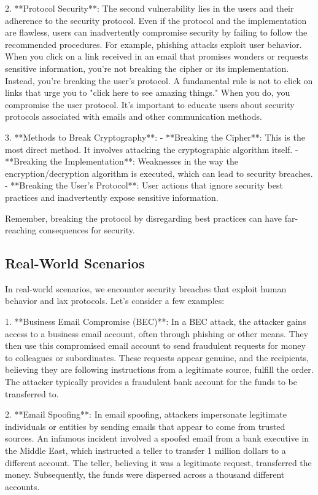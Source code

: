 \documentclass{class}
\begin{document}
2. **Protocol Security**: The second vulnerability lies in the users and their adherence to the security protocol. Even if the protocol and the implementation are flawless, users can inadvertently compromise security by failing to follow the recommended procedures. For example, phishing attacks exploit user behavior. When you click on a link received in an email that promises wonders or requests sensitive information, you're not breaking the cipher or its implementation. Instead, you're breaking the user's protocol. A fundamental rule is not to click on links that urge you to "click here to see amazing things." When you do, you compromise the user protocol. It's important to educate users about security protocols associated with emails and other communication methods.

3. **Methods to Break Cryptography**:
- **Breaking the Cipher**: This is the most direct method. It involves attacking the cryptographic algorithm itself.
- **Breaking the Implementation**: Weaknesses in the way the encryption/decryption algorithm is executed, which can lead to security breaches.
- **Breaking the User's Protocol**: User actions that ignore security best practices and inadvertently expose sensitive information.

Remember, breaking the protocol by disregarding best practices can have far-reaching consequences for security.

\subsection{Real-World Scenarios}

In real-world scenarios, we encounter security breaches that exploit human behavior and lax protocols. Let's consider a few examples:

1. **Business Email Compromise (BEC)**: In a BEC attack, the attacker gains access to a business email account, often through phishing or other means. They then use this compromised email account to send fraudulent requests for money to colleagues or subordinates. These requests appear genuine, and the recipients, believing they are following instructions from a legitimate source, fulfill the order. The attacker typically provides a fraudulent bank account for the funds to be transferred to.

2. **Email Spoofing**: In email spoofing, attackers impersonate legitimate individuals or entities by sending emails that appear to come from trusted sources. An infamous incident involved a spoofed email from a bank executive in the Middle East, which instructed a teller to transfer 1 million dollars to a different account. The teller, believing it was a legitimate request, transferred the money. Subsequently, the funds were dispersed across a thousand different accounts.
\end{document}
